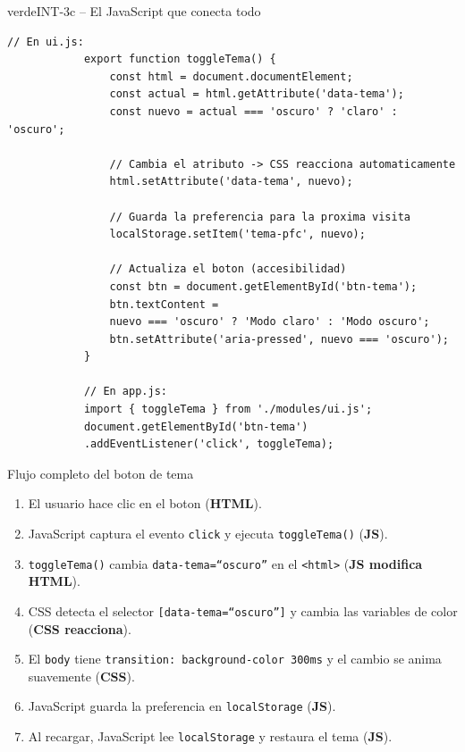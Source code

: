 \documentclass[11pt,a4paper]{article}
\begin{document}
	\begin{cajacodigo}{verde}{INT-3c -- El JavaScript que conecta todo}
		\begin{lstlisting}[style=codejs]
			// En ui.js:
			export function toggleTema() {
				const html = document.documentElement;
				const actual = html.getAttribute('data-tema');
				const nuevo = actual === 'oscuro' ? 'claro' : 'oscuro';
				
				// Cambia el atributo -> CSS reacciona automaticamente
				html.setAttribute('data-tema', nuevo);
				
				// Guarda la preferencia para la proxima visita
				localStorage.setItem('tema-pfc', nuevo);
				
				// Actualiza el boton (accesibilidad)
				const btn = document.getElementById('btn-tema');
				btn.textContent =
				nuevo === 'oscuro' ? 'Modo claro' : 'Modo oscuro';
				btn.setAttribute('aria-pressed', nuevo === 'oscuro');
			}
			
			// En app.js:
			import { toggleTema } from './modules/ui.js';
			document.getElementById('btn-tema')
			.addEventListener('click', toggleTema);
		\end{lstlisting}
	\end{cajacodigo}
	
	\begin{cajaresultado}{Flujo completo del boton de tema}
		\begin{enumerate}[leftmargin=1.5em,itemsep=3pt]
			\item El usuario hace clic en el boton (\textbf{HTML}).
			\item JavaScript captura el evento \texttt{click} y ejecuta \texttt{toggleTema()} (\textbf{JS}).
			\item \texttt{toggleTema()} cambia \texttt{data-tema=``oscuro''} en el \texttt{<html>} (\textbf{JS modifica HTML}).
			\item CSS detecta el selector \texttt{[data-tema=``oscuro'']} y cambia las variables de color (\textbf{CSS reacciona}).
			\item El \texttt{body} tiene \texttt{transition: background-color 300ms} y el cambio se anima suavemente (\textbf{CSS}).
			\item JavaScript guarda la preferencia en \texttt{localStorage} (\textbf{JS}).
			\item Al recargar, JavaScript lee \texttt{localStorage} y restaura el tema (\textbf{JS}).
		\end{enumerate}
	\end{cajaresultado}
	
\end{document}
